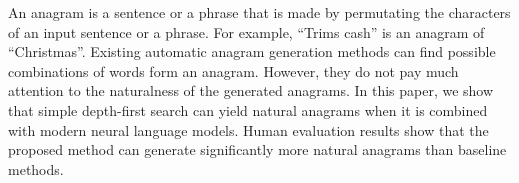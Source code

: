 An anagram is a sentence or a phrase that is made by permutating the characters of an input sentence or a phrase. For example, ``Trims cash'' is an anagram of ``Christmas''. Existing automatic anagram generation methods can find possible combinations of words form an anagram. However, they do not pay much attention to the naturalness of the generated anagrams. In this paper, we show that simple depth-first search can yield natural anagrams when it is combined with modern neural language models. Human evaluation results show that the proposed method can generate significantly more natural anagrams than baseline methods.
